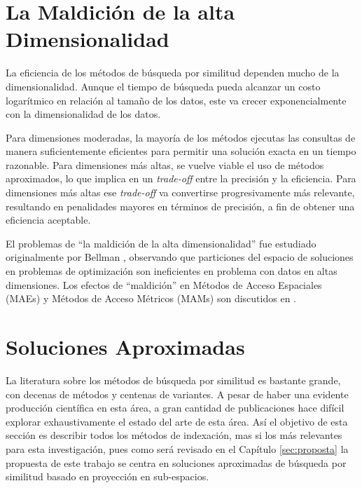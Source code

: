\section{La Maldición  de la alta Dimensionalidad} \label{sec:madicao-dimensionalidade}

La eficiencia de los métodos de búsqueda por similitud dependen mucho de la dimensionalidad. Aunque el tiempo de búsqueda pueda alcanzar un costo logarítmico en relación al tamaño de los datos, este va crecer exponencialmente con la dimensionalidad de los datos.

Para dimensiones moderadas, la mayoría de los métodos ejecutas las consultas de manera suficientemente eficientes para permitir una solución exacta  en un tiempo razonable. Para dimensiones más altas, se vuelve viable el uso de métodos aproximados,  lo que implica en un \textit{trade-off}  entre la precisión y la eficiencia. Para dimensiones más altas ese \textit{trade-off}  va convertirse progresivamente más relevante, resultando en penalidades mayores en términos de precisión, a fin de obtener una eficiencia aceptable.

El problemas de ``la maldición de la alta dimensionalidad'' fue estudiado originalmente por Bellman \cite{citeulike:Bellman}, observando que particiones del espacio de soluciones en problemas de optimización son ineficientes en problema con datos en altas dimensiones. Los efectos de ``maldición'' en Métodos de Acceso Espaciales (MAEs) y Métodos de Acceso Métricos (MAMs) son discutidos en  \cite{aleman_high_dimensional, WhatsWrong, DBLP:journals/corr/abs-0906-0391}.


\section{Soluciones Aproximadas}\label{sec:solucoes-aproximadas}

La literatura sobre los métodos de búsqueda por similitud es bastante grande, con decenas de métodos y centenas de variantes. A pesar de haber una evidente producción científica en esta área, a gran cantidad de publicaciones hace difícil explorar exhaustivamente el estado del arte de esta área. Así el objetivo de esta sección   es describir todos los métodos de indexación, mas si los más relevantes para esta investigación, pues como será revisado en el Capítulo \ref{sec:proposta}  la propuesta de este trabajo se centra en soluciones aproximadas de búsqueda por similitud basado en proyección en sub-espacios.



